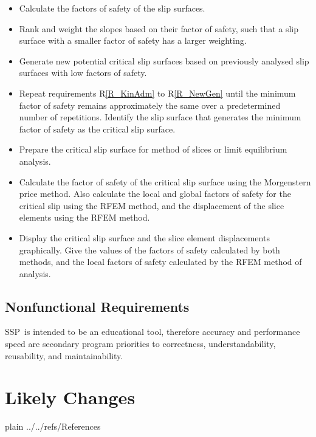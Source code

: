 \documentclass[12pt]{article}
\newcommand{\progname}{SSP}
\newcounter{reqnum} %
\newcommand{\rref}[1]{R\ref{#1}}
\begin{document}
\begin{itemize}
\item[R\refstepcounter{reqnum}\thereqnum \label{R_FS}:] Calculate the
  factors of safety of the slip surfaces.

\item[R\refstepcounter{reqnum}\thereqnum \label{R_Weight}:] Rank and
  weight the slopes based on their factor of safety, such that a slip
  surface with a smaller factor of safety has a larger weighting.

\item[R\refstepcounter{reqnum}\thereqnum \label{R_NewGen}:] Generate
  new potential critical slip surfaces based on previously analysed
  slip surfaces with low factors of safety.

\item[R\refstepcounter{reqnum}\thereqnum \label{R_Minimize}:] Repeat
  requirements \rref{R_KinAdm} to \rref{R_NewGen} until the
  minimum factor of safety remains approximately the same over a
  predetermined number of repetitions. Identify the slip surface that
  generates the minimum factor of safety as the critical slip surface.

\item[R\refstepcounter{reqnum}\thereqnum \label{R_PrepOutput}:]
  Prepare the critical slip surface for method of slices or limit
  equilibrium analysis.

\item[R\refstepcounter{reqnum}\thereqnum \label{R_Analyze}:] Calculate
  the factor of safety of the critical slip surface using the
  Morgenstern price method. Also calculate the local and global
  factors of safety for the critical slip using the RFEM method, and
  the displacement of the slice elements using the RFEM method.

\item[R\refstepcounter{reqnum}\thereqnum \label{R_Output}:] Display
  the critical slip surface and the slice element displacements
  graphically. Give the values of the factors of safety calculated by
  both methods, and the local factors of safety calculated by the RFEM
  method of analysis.
  
\end{itemize}


\subsection{Nonfunctional Requirements}

\progname\ is intended to be an educational tool, therefore accuracy and
performance speed are secondary program priorities to correctness,
understandability, reusability, and maintainability.

\section{Likely Changes}    


 {plain}
 {../../refs/References}
\end{document}
